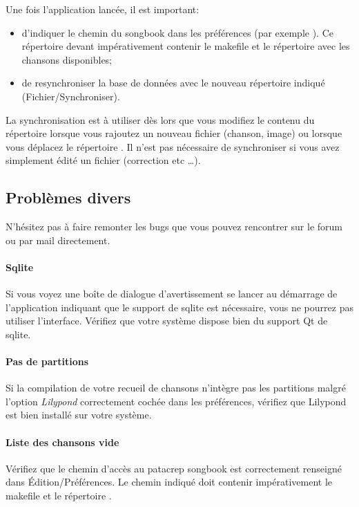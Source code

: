 \documentclass[versionenligne]{framabook}
\begin{document}
Une fois l'application lancée, il est important:
\begin{itemize}
\item d'indiquer le chemin du songbook dans les préférences (par
  exemple ). Ce répertoire devant impérativement
  contenir le makefile et le répertoire  avec les chansons
  disponibles;
\item de resynchroniser la base de données avec le nouveau répertoire
  indiqué (Fichier/Synchroniser).
\end{itemize}

\begin{nota}
  La synchronisation est à utiliser dès lors que vous modifiez le
  contenu du répertoire  lorsque vous rajoutez un nouveau
  fichier (chanson, image) ou lorsque vous déplacez le répertoire
  .  Il n'est pas nécessaire de synchroniser si vous
  avez simplement édité un fichier (correction etc \dots).
\end{nota}

\subsection{Problèmes divers}

N'hésitez pas à faire remonter les bugs que vous pouvez rencontrer sur
le forum ou par mail directement. 

\paragraph{Sqlite} Si vous voyez une boîte de dialogue
d'avertissement se lancer au démarrage de l'application indiquant que
le support de sqlite est nécessaire, vous ne pourrez pas utiliser
l'interface. Vérifiez que votre système dispose bien du support Qt de sqlite.

\paragraph{Pas de partitions}
Si la compilation de votre recueil de chansons n'intègre pas les
partitions malgré l'option \emph{Lilypond} correctement cochée dans les
préférences, vérifiez que Lilypond est bien installé sur votre système. 

\paragraph{Liste des chansons vide} Vérifiez que le chemin d'accès au
patacrep songbook est correctement renseigné dans Édition/Préférences.
Le chemin indiqué doit contenir impérativement le makefile et le
répertoire .
\end{document}
